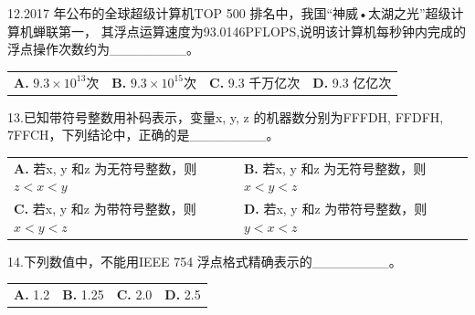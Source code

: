 \documentclass[UTF8,11pt]{ctexart}
\begin{document}
12.2017 年公布的全球超级计算机TOP 500 排名中，我国“神威•太湖之光”超级计算机蝉联第一， 其浮点运算速度为93.0146PFLOPS,说明该计算机每秒钟内完成的浮点操作次数约为\_\_\_\_\_\_\_\_。


\begin{center}\begin{tabular}{>{\raggedright\arraybackslash}p{\dimexpr(\linewidth-8\tabcolsep)/4\relax}>{\raggedright\arraybackslash}p{\dimexpr(\linewidth-8\tabcolsep)/4\relax}>{\raggedright\arraybackslash}p{\dimexpr(\linewidth-8\tabcolsep)/4\relax}>{\raggedright\arraybackslash}p{\dimexpr(\linewidth-8\tabcolsep)/4\relax}}
\textbf{A.} \(\displaystyle 9.3\times10^{13}\)次 & \textbf{B.} \(\displaystyle 9.3\times10^{15}\)次 & \textbf{C.} 9.\allowbreak{}3 千万亿次 & \textbf{D.} 9.\allowbreak{}3 亿亿次\\[.35em]\end{tabular}\end{center}

13.已知带符号整数用补码表示，变量x, y, z 的机器数分别为FFFDH, FFDFH, 7FFCH，下列结论中，正确的是\_\_\_\_\_\_\_\_。


\begin{center}\begin{tabular}{>{\raggedright\arraybackslash}p{\dimexpr(\linewidth-4\tabcolsep)/2\relax}>{\raggedright\arraybackslash}p{\dimexpr(\linewidth-4\tabcolsep)/2\relax}}
\textbf{A.} 若x, y 和z 为无符号整数，则\(\displaystyle z<x<y\) & \textbf{B.} 若x, y 和z 为无符号整数，则\(\displaystyle x<y<z\)\\[.35em]
\textbf{C.} 若x, y 和z 为带符号整数，则\(\displaystyle x<y<z\) & \textbf{D.} 若x, y 和z 为带符号整数，则\(\displaystyle y<x<z\)\\[.35em]\end{tabular}\end{center}

14.下列数值中，不能用IEEE 754 浮点格式精确表示的\_\_\_\_\_\_\_\_。


\begin{center}\begin{tabular}{>{\raggedright\arraybackslash}p{\dimexpr(\linewidth-8\tabcolsep)/4\relax}>{\raggedright\arraybackslash}p{\dimexpr(\linewidth-8\tabcolsep)/4\relax}>{\raggedright\arraybackslash}p{\dimexpr(\linewidth-8\tabcolsep)/4\relax}>{\raggedright\arraybackslash}p{\dimexpr(\linewidth-8\tabcolsep)/4\relax}}
\textbf{A.} 1.\allowbreak{}2 & \textbf{B.} 1.\allowbreak{}25 & \textbf{C.} 2.\allowbreak{}0 & \textbf{D.} 2.\allowbreak{}5\\[.35em]\end{tabular}\end{center}
\end{document}
